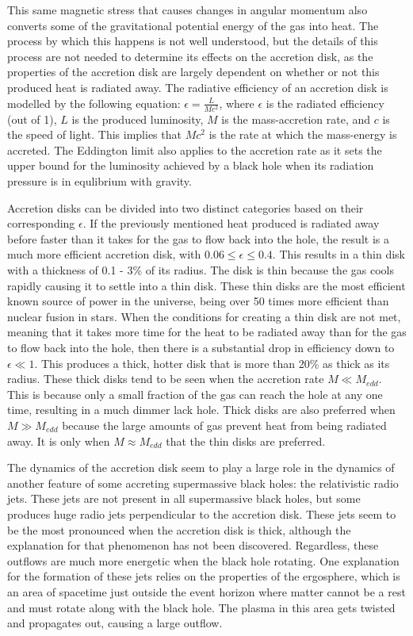 \documentclass[12pt]{article}
\begin{document}
This same magnetic stress that causes changes in angular momentum also
converts some of the gravitational potential energy of the gas into heat.
The process by which this happens is not well understood, but the details of
this process are not needed to determine its effects on the accretion disk,
as the properties of the accretion disk are largely dependent on whether or
not this produced heat is radiated away.  The radiative efficiency of an
accretion disk is modelled by the following equation:
$\epsilon = \frac{L}{Mc^2}$, where $\epsilon$ is the radiated efficiency
(out of 1), $L$ is the produced luminosity, $M$ is the mass-accretion rate,
and $c$ is the speed of light.  This implies that $Mc^2$ is the rate at
which the mass-energy is accreted.  The Eddington limit also applies to the
accretion rate as it sets the upper bound for the luminosity achieved by a
black hole when its radiation pressure is in equlibrium with gravity.

Accretion disks can be divided into two
distinct categories based on their corresponding $\epsilon$.  If the
previously mentioned heat produced is radiated away before faster than it
takes for the gas to flow back into the hole, the result is a much more
efficient accretion disk, with $0.06 \le \epsilon \le 0.4$.  This results in
a thin disk with a thickness of 0.1 - 3\% of its radius.  The disk is thin
because the gas cools rapidly causing it to settle into a thin disk.  These
thin disks are the most efficient known source of power in the universe,
being over 50 times more efficient than nuclear fusion in stars.  When the
conditions for creating a thin disk are not met, meaning that it takes more
time for the heat to be radiated away than for the gas to flow back into the
hole, then there is a substantial drop in efficiency down to $\epsilon \ll
1$.  This produces a thick, hotter disk that is more than 20\% as thick as
its radius.  These thick disks tend to be seen when the accretion rate $M
\ll M_{edd}$.  This is because only a small fraction of the gas can reach
the hole at any one time, resulting in a much dimmer lack hole.  Thick disks
are also preferred when $M \gg M_{edd}$ because the large amounts of gas
prevent heat from being radiated away.  It is only when $M \approx M_{edd}$
that the thin disks are preferred.

The dynamics of the accretion disk seem to play a large role in the dynamics of
another feature of some accreting supermassive black holes: the relativistic
radio jets.  These jets are not present in all supermassive black holes, but
some produces huge radio jets perpendicular to the accretion disk.  These jets
seem to be the most pronounced when the accretion disk is thick, although the
explanation for that phenomenon has not been discovered.  Regardless, these
outflows are much more energetic when the black hole rotating.  One explanation
for the formation of these jets relies on the properties of the ergosphere,
which is an area of spacetime just outside the event horizon where matter cannot
be a rest and must rotate along with the black hole.  The plasma in this area
gets twisted and propagates out, causing a large outflow.
\end{document}
